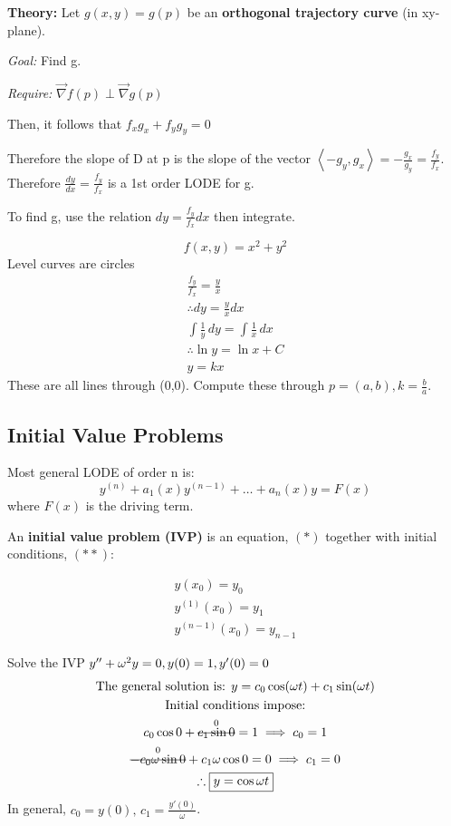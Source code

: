 \documentclass[../main.tex]{subfiles}
\begin{document}
\textbf{Theory:}
Let \( g(x,y)=g(p) \) be an \textbf{orthogonal trajectory curve} (in xy-plane).

\textit{Goal:} Find g.

\textit{Require:} \( \vec{\nabla}f(p)\perp\vec{\nabla}g(p) \)

Then, it follows that \( f_{x}g_{x}+f_{y}g_{y}=0 \)

Therefore the slope of D at p is the slope of the vector \( \displaystyle \left< -g_{y},g_{x} \right> =-\frac{g_{x}}{g_{y}}=\frac{f_{y}}{f_{x}} \). \\
Therefore \( \displaystyle \frac{dy}{dx}=\frac{f_{y}}{f_{x}} \) is a 1st order LODE for g.

To find g, use the relation \( \displaystyle dy=\frac{f_{y}}{f_{x}}dx \) then integrate.

\begin{example}[]
    \[ f(x,y)=x^2+y^2 \]
    Level curves are circles
    \begin{gather*}
        \frac{f_{y}}{f_{x}}=\frac{y}{x} \\
        \therefore dy=\frac{y}{x}dx \\
        \int \frac{1}{y} \, dy = \int \frac{1}{x} \, dx \\
        \therefore \ln y=\ln x + C \\
        y=kx
    \end{gather*}
    These are all lines through (0,0).
    Compute these through \( \displaystyle p=(a,b),k=\frac{b}{a} \).
\end{example}

\subsection{Initial Value Problems}

Most general LODE of order n is:
\[ y^{(n)}+a_{1}(x)y^{(n-1)}+\dots+a_{n}(x)y=F(x) \]
where \( F(x) \) is the driving term.

An \textbf{initial value problem (IVP)} is an equation, \( (*) \) together with initial conditions, \( (* *) \):

\begin{gather*}
    y(x_{0})=y_{0} \\
    y^{(1)}(x_{0})=y_{1} \\
    y^{(n-1)}(x_{0})=y_{n-1}
\end{gather*}

\begin{example}[]
    Solve the IVP \( y''+\omega^2y=0, \space y(0)=1,\space y'(0)=0 \)
    \begin{gather*}
        \text{The general solution is: } y=c_{0}\cos(\omega t)+c_{1}\sin(\omega t) \\
        \text{Initial conditions impose:} \\
        c_{0}\cos0+\overset{0}{\msout{c_{1}\sin0}}=1 \implies c_0 = 1 \\
        \overset{0}{\msout{-c_0\omega\sin0}}+c_1\omega\cos0=0 \implies c_1 = 0 \\
        \therefore \boxed{y=\cos \omega t}
    \end{gather*}
    In general, \( c_0 = y(0),\,c_1 = \frac{y'(0)}{\omega} \).
\end{example}
\end{document}
